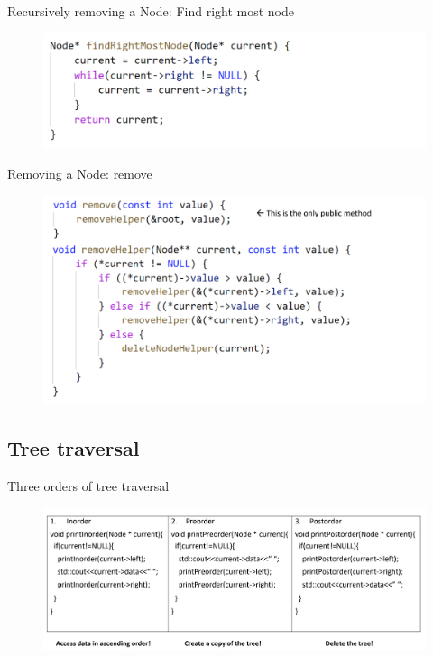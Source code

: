 \documentclass[aspectratio=169]{beamer}
\begin{document}
\begin{frame}{Recursively removing a Node:  Find right most node}
        \begin{figure}
            \includegraphics[width=\textwidth]{BST_FRM.png}
    \end{figure}
\end{frame}

\begin{frame}{Removing a Node: remove}
        \begin{figure}
            \includegraphics[width=\textwidth]{BST_remove.png}
    \end{figure}
\end{frame}

\subsection{Tree traversal}
\begin{frame}{Three orders of tree traversal}
        \begin{figure}
            \includegraphics[width=\textwidth]{BST_traverse.png}
    \end{figure}
\end{frame}
\end{document}
